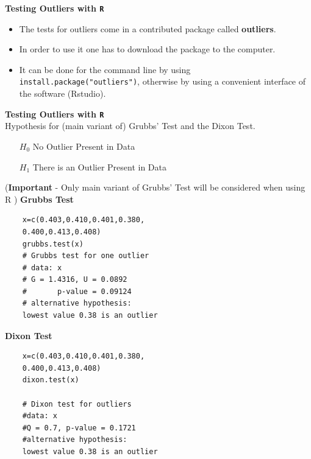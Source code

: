 \documentclass[a4paper,12pt]{article}
\begin{document}
\Large
\textbf{Testing Outliers with \texttt{R}}\\
\begin{itemize}
	\item The tests for outliers come in a contributed package called
	\textbf{outliers}.
	\item In order to use it one has to download the package to
	the computer. 
	\item It can be done for the command line by using
	\texttt{install.package("outliers")}, otherwise by using a
	convenient interface of the software (Rstudio).
\end{itemize}

\Large
\textbf{Testing Outliers with \texttt{R}}\\	
Hypothesis for (main variant of) Grubbs' Test and the Dixon Test.

\begin{itemize}
	\item[$H_0$] No Outlier Present in Data
	\item[$H_1$] There is an Outlier Present in Data
\end{itemize}
\bigskip
(\textbf{Important} - Only main variant of Grubbs' Test will be considered when using R )
\Large
\textbf{Grubbs Test}
\begin{framed}
	\begin{verbatim}
	x=c(0.403,0.410,0.401,0.380,
	0.400,0.413,0.408)
	grubbs.test(x)
	# Grubbs test for one outlier
	# data: x
	# G = 1.4316, U = 0.0892
	#       p-value = 0.09124
	# alternative hypothesis: 
	lowest value 0.38 is an outlier
	\end{verbatim}
\end{framed}

\Large
\textbf{Dixon Test}
\begin{framed}
	\begin{verbatim}
	x=c(0.403,0.410,0.401,0.380,
	0.400,0.413,0.408)
	dixon.test(x)
	
	# Dixon test for outliers
	#data: x
	#Q = 0.7, p-value = 0.1721
	#alternative hypothesis: 
	lowest value 0.38 is an outlier
	\end{verbatim}
\end{framed}
\end{document}
